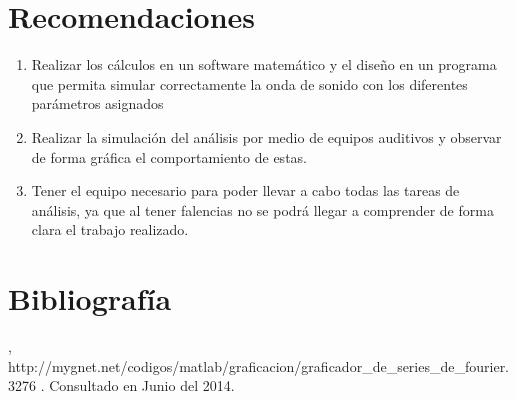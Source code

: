 \documentclass[10pt,a4paper]{book}
\begin{document}
\section{Recomendaciones}

\begin{enumerate}
\item Realizar los cálculos en un software matemático y el diseño en un programa que permita simular correctamente la onda de sonido con los diferentes parámetros asignados
\item Realizar la simulación del análisis por medio de equipos auditivos y observar de forma gráfica el comportamiento de estas.
\item Tener el equipo necesario para poder llevar a cabo todas las tareas de análisis, ya que al tener falencias no se podrá llegar a comprender de forma clara el trabajo realizado.

\end{enumerate}


\section{Bibliografía}

\begin{thebibliography}{99}
 , {http://mygnet.net/codigos/matlab/graficacion/graficador_de_series_de_fourier.3276} . Consultado en Junio del 2014.
\end{thebibliography}

\end{document}
